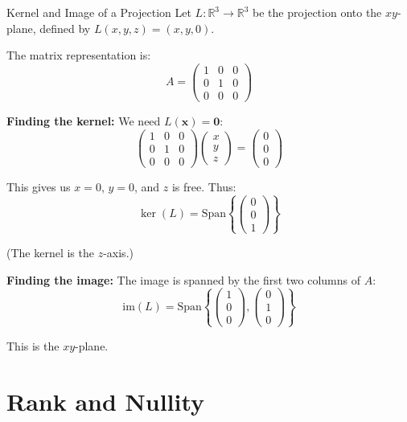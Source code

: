 \documentclass[12pt,a4paper]{article}
\newcommand{\R}{\mathbb{R}}
\newcommand{\vv}[1]{\mathbf{#1}}
\newcommand{\vzero}{\mathbf{0}}
\newcommand{\Span}{\text{Span}}
\newcommand{\im}{\text{im}}
\begin{document}
	\begin{example}{Kernel and Image of a Projection}
		Let $L: \R^3 \to \R^3$ be the projection onto the $xy$-plane, defined by $L(x, y, z) = (x, y, 0)$.
		
		The matrix representation is:
		\[
		A = \begin{pmatrix} 1 & 0 & 0 \\ 0 & 1 & 0 \\ 0 & 0 & 0 \end{pmatrix}
		\]
		
		\textbf{Finding the kernel:} We need $L(\vv{x}) = \vzero$:
		\[
		\begin{pmatrix} 1 & 0 & 0 \\ 0 & 1 & 0 \\ 0 & 0 & 0 \end{pmatrix} \begin{pmatrix} x \\ y \\ z \end{pmatrix} = \begin{pmatrix} 0 \\ 0 \\ 0 \end{pmatrix}
		\]
		
		This gives us $x = 0$, $y = 0$, and $z$ is free. Thus:
		\[
		\ker(L) = \Span\left\{\begin{pmatrix} 0 \\ 0 \\ 1 \end{pmatrix}\right\}
		\]
		
		(The kernel is the $z$-axis.)
		
		\textbf{Finding the image:} The image is spanned by the first two columns of $A$:
		\[
		\im(L) = \Span\left\{\begin{pmatrix} 1 \\ 0 \\ 0 \end{pmatrix}, \begin{pmatrix} 0 \\ 1 \\ 0 \end{pmatrix}\right\}
		\]
		
		This is the $xy$-plane.
	\end{example}
	
	\newpage
	
	\section{Rank and Nullity}
	
\end{document}
